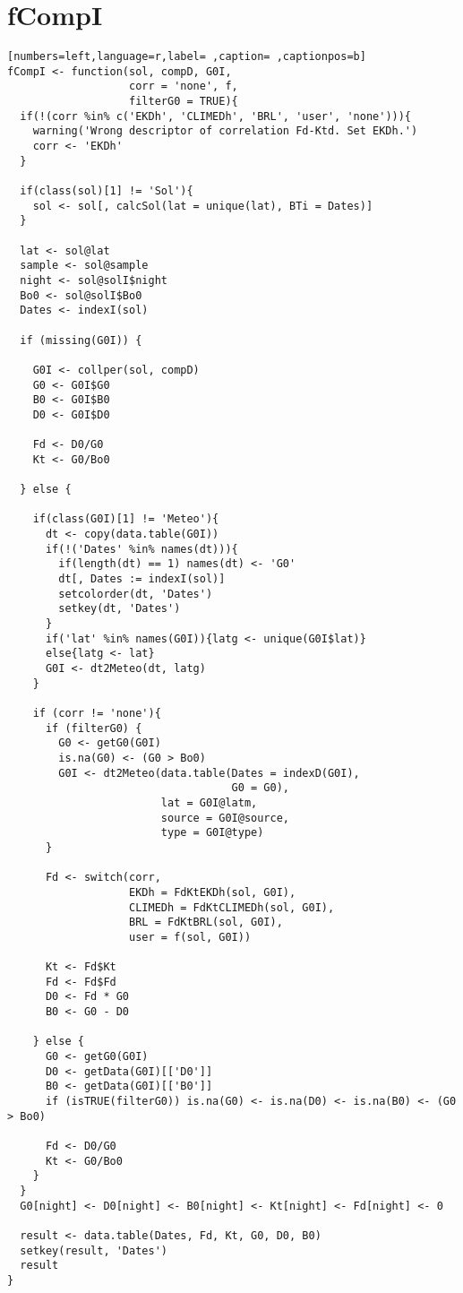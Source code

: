 \section{fCompI}
\label{sec:org392bf54}
\begin{lstlisting}[numbers=left,language=r,label= ,caption= ,captionpos=b]
fCompI <- function(sol, compD, G0I,
                   corr = 'none', f,
                   filterG0 = TRUE){
  if(!(corr %in% c('EKDh', 'CLIMEDh', 'BRL', 'user', 'none'))){
    warning('Wrong descriptor of correlation Fd-Ktd. Set EKDh.')
    corr <- 'EKDh'
  }
  
  if(class(sol)[1] != 'Sol'){
    sol <- sol[, calcSol(lat = unique(lat), BTi = Dates)]
  }

  lat <- sol@lat
  sample <- sol@sample
  night <- sol@solI$night
  Bo0 <- sol@solI$Bo0
  Dates <- indexI(sol)
  
  if (missing(G0I)) { 

    G0I <- collper(sol, compD)
    G0 <- G0I$G0
    B0 <- G0I$B0
    D0 <- G0I$D0

    Fd <- D0/G0
    Kt <- G0/Bo0
    
  } else { 

    if(class(G0I)[1] != 'Meteo'){
      dt <- copy(data.table(G0I))
      if(!('Dates' %in% names(dt))){
        if(length(dt) == 1) names(dt) <- 'G0'
        dt[, Dates := indexI(sol)]
        setcolorder(dt, 'Dates')
        setkey(dt, 'Dates')
      }
      if('lat' %in% names(G0I)){latg <- unique(G0I$lat)}
      else{latg <- lat}
      G0I <- dt2Meteo(dt, latg)
    }
    
    if (corr != 'none'){
      if (filterG0) {
        G0 <- getG0(G0I)
        is.na(G0) <- (G0 > Bo0)
        G0I <- dt2Meteo(data.table(Dates = indexD(G0I),
                                   G0 = G0),
                        lat = G0I@latm,
                        source = G0I@source,
                        type = G0I@type)
      }

      Fd <- switch(corr,
                   EKDh = FdKtEKDh(sol, G0I),
                   CLIMEDh = FdKtCLIMEDh(sol, G0I),
                   BRL = FdKtBRL(sol, G0I), 
                   user = f(sol, G0I))

      Kt <- Fd$Kt
      Fd <- Fd$Fd
      D0 <- Fd * G0
      B0 <- G0 - D0

    } else { 
      G0 <- getG0(G0I)
      D0 <- getData(G0I)[['D0']]
      B0 <- getData(G0I)[['B0']]
      if (isTRUE(filterG0)) is.na(G0) <- is.na(D0) <- is.na(B0) <- (G0 > Bo0)
      
      Fd <- D0/G0
      Kt <- G0/Bo0
    }
  }
  G0[night] <- D0[night] <- B0[night] <- Kt[night] <- Fd[night] <- 0

  result <- data.table(Dates, Fd, Kt, G0, D0, B0)
  setkey(result, 'Dates')
  result
}
\end{lstlisting}
